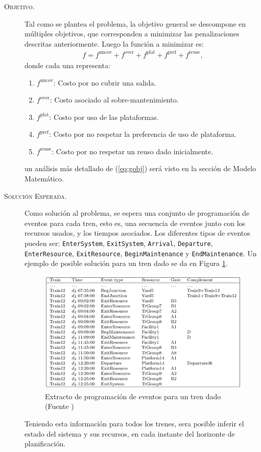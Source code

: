 \documentclass[letter, 10pt]{article}
\begin{document}
\begin{description}
	\item[\textsc{Objetivo.}] Tal como se plantea el problema, la objetivo general se descompone en múltiples objetivos,
	que corresponden a minimizar las penalizaciones descritas anteriormente. Luego la función a minimizar es:
	\begin{align}
		f = f^{\text{uncov}} + f^{\text{over}} + f^{\text{plat}} + f^{\text{pref}} + f^{\text{reuse}},
		\label{eq:gobj}
	\end{align}
	donde cada una representa:
	\begin{enumerate}
		\item $f^{\text{uncov}}$: Costo por no cubrir una salida.
		\item $f^{\text{over}}$: Costo asociado al sobre-mantenimiento.
		\item $f^{\text{plat}}$: Costo por uso de las plataformas.
		\item $f^{\text{pref}}$: Costo por no respetar la preferencia de uso de plataforma.
		\item $f^{\text{reuse}}$: Costo por no respetar un reuso dado inicialmente. 
	\end{enumerate}
	un análisis más detallado de (\ref{eq:gobj}) será visto en la sección de Modelo Matemático.
	\item[\textsc{Solución Esperada.}] Como solución al problema, se espera una conjunto de programación de eventos
	para cada tren, esto es, una secuencia de eventos junto con los recursos usados, y los tiempos asociados. Los diferentes tipos de eventos pueden ser: \texttt{EnterSystem}, \texttt{ExitSystem}, \texttt{Arrival}, \texttt{Departure}, \texttt{EnterResource}, \texttt{ExitResource}, \texttt{BeginMaintenance} y \texttt{EndMaintenance}. Un ejemplo de posible solución para un tren dado se da en Figura \ref{fig:sched}.
	 \begin{figure}[htpb!]
	\centering
	\includegraphics[width=12cm]{sched}
	\caption{Extracto de programación de eventos para un tren dado (Fuente \cite{Problem})}
	\label{fig:sched}
	\end{figure}
	Teniendo esta información para todos los trenes, sera posible inferir el estado del sistema y sus recursos, en cada instante del horizonte de planificación.

\end{description}
\end{document}
